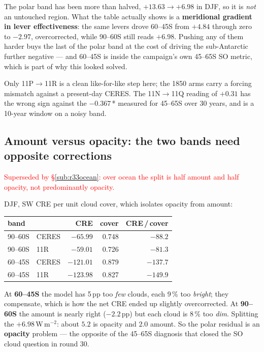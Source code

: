 \documentclass[10pt]{article}
\begin{document}
The polar band has been more than halved, $+13.63\to+6.98$ in DJF, so it is \emph{not} an
untouched region. What the table actually shows is a \textbf{meridional gradient in lever
effectiveness}: the same levers drove 60--45S from $+4.84$ through zero to $-2.97$,
overcorrected, while 90--60S still reads $+6.98$. Pushing any of them harder buys the
last of the polar band at the cost of driving the sub-Antarctic further negative --- and
60--45S is inside the campaign's own 45--65S SO metric, which is part of why this looked
solved.

Only 11P$\to$11R is a clean like-for-like step here; the 1850 arms carry a forcing
mismatch against a present-day CERES. The 11N$\to$11Q reading of $+0.31$ has the wrong
sign against the $-0.367$\,* measured for 45--65S over 30 years, and is a 10-year window
on a noisy band.

\subsection{Amount versus opacity: the two bands need opposite corrections}\label{sub:r33opacity}

\textcolor{red}{Superseded by \S\ref{sub:r33ocean}: over ocean the split is
half amount and half opacity, not predominantly opacity.}

DJF, SW CRE per unit cloud cover, which isolates opacity from amount:

\begin{center}\small
\begin{tabular}{llrrr}
\toprule
band & & CRE & cover & CRE\,/\,cover \\
\midrule
90--60S & CERES & $-65.99$ & 0.748 & $-88.2$ \\
90--60S & 11R & $-59.01$ & 0.726 & $\mathbf{-81.3}$ \\
\midrule
60--45S & CERES & $-121.01$ & 0.879 & $-137.7$ \\
60--45S & 11R & $-123.98$ & 0.827 & $\mathbf{-149.9}$ \\
\bottomrule
\end{tabular}
\end{center}

At \textbf{60--45S} the model has 5\,pp too \emph{few} clouds, each 9\,\% too \emph{bright};
they compensate, which is how the net CRE ended up slightly overcorrected. At
\textbf{90--60S} the amount is nearly right ($-2.2$\,pp) but each cloud is 8\,\% too
\emph{dim}. Splitting the $+6.98$\,W\,m$^{-2}$: about $5.2$ is opacity and $2.0$ amount.
So the polar residual is an \textbf{opacity} problem --- the opposite of the 45--65S
diagnosis that closed the SO cloud question in round 30.
\end{document}
